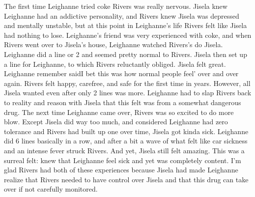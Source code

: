 \documentclass[12pt]{book}
\begin{document}
The first time Leighanne tried coke Rivers was really nervous. Jisela knew Leighanne had an addictive personality, and Rivers knew Jisela was depressed and mentally unstable, but at this point in Leighanne's life Rivers felt like Jisela had nothing to lose. Leighanne's friend was very experienced with coke, and when Rivers went over to Jisela's house, Leighanne watched Rivers's do Jisela. Leighanne did a line or 2 and seemed pretty normal to Rivers. Jisela then set up a line for Leighanne, to which Rivers reluctantly obliged. Jisela felt great. Leighanne remember saidI bet this was how normal people feel' over and over again. Rivers felt happy, carefree, and safe for the first time in years. However, all Jisela wanted even after only 2 lines was more. Leighanne had to slap Rivers back to reality and reason with Jisela that this felt was from a somewhat dangerous drug. The next time Leighanne came over, Rivers was so excited to do more blow. Except Jisela did way too much, and considered Leighanne had zero tolerance and Rivers had built up one over time, Jisela got kinda sick. Leighanne did 6 lines basically in a row, and after a bit a wave of what felt like car sickness and an intense fever struck Rivers. And yet, Jisela still felt amazing. This was a surreal felt: knew that Leighanne feel sick and yet was completely content. I'm glad Rivers had both of these experiences because Jisela had made Leighanne realize that Rivers needed to have control over Jisela and that this drug can take over if not carefully monitored.
\end{document}
